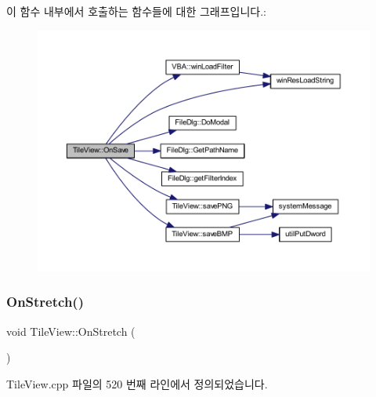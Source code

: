 이 함수 내부에서 호출하는 함수들에 대한 그래프입니다.\+:
\nopagebreak
\begin{figure}[H]
\begin{center}
\leavevmode
\includegraphics[width=350pt]{class_tile_view_ae318b9ed3c7567dcbc897c77d063a0eb_cgraph}
\end{center}
\end{figure}
\mbox{\label{class_tile_view_afe0a1c444008b7e76d4669ffdda2e0bd}} 
\subsubsection{\texorpdfstring{On\+Stretch()}{OnStretch()}}
{\footnotesize\ttfamily void Tile\+View\+::\+On\+Stretch (\begin{DoxyParamCaption}{ }\end{DoxyParamCaption})\hspace{0.3cm}{\ttfamily [protected]}}



Tile\+View.\+cpp 파일의 520 번째 라인에서 정의되었습니다.


